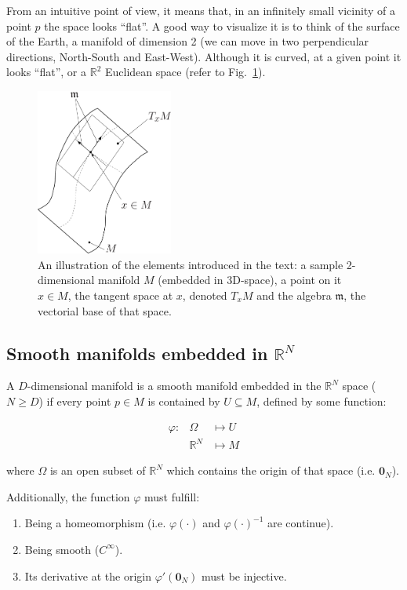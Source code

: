 \documentclass[a4paper,11pt]{report}
\begin{document}
From an intuitive point of view, it means that, in an infinitely small vicinity of
a point $p$ the space looks ``flat''. A good way to visualize it is to think
of the surface of the Earth, a manifold of dimension 2 (we can move in two perpendicular
directions, North-South and East-West). Although it is curved, at a given point
it looks ``flat'', or a $\mathbb{R}^2$ Euclidean space (refer to Fig.~\ref{fig:manifold}).


\begin{figure}
\centering
\includegraphics[width=0.40\textwidth]{imgs/manifold_tangent_space.pdf}
\caption{An illustration of the elements introduced in the text:
a sample 2-dimensional manifold $M$ (embedded in 3D-space),
a point on it $x \in M$, the tangent space at $x$,
denoted $T_x M$ and the algebra $\mathfrak{m}$, the vectorial base of that space.
}
\label{fig:manifold}
\end{figure}

\subsection{Smooth manifolds embedded in $\mathbb{R}^N$}
\label{sect:smooth_manif}

A $D$-dimensional manifold is a smooth manifold embedded in the
$\mathbb{R}^N$ space ($N \geq D$) if every point $p \in M$ is
contained by $U \subseteq M$, defined by some function:

\begin{eqnarray}
 \varphi: & \Omega & \mapsto U \\
              & \mathbb{R}^N &  \mapsto M
\end{eqnarray}

\noindent where $\Omega$ is an open subset of $\mathbb{R}^N$
which contains the origin of that space (i.e. $\mathbf{0}_N$).

Additionally, the function $\varphi$ must fulfill:
\begin{enumerate}
 \item Being a homeomorphism (i.e. $\varphi(\cdot)$ and $\varphi(\cdot)^{-1}$ are continue).
 \item Being smooth ($C^{\infty}$).
 \item Its derivative at the origin $\varphi'(\mathbf{0}_N)$ must be injective.
\end{enumerate}
\end{document}
